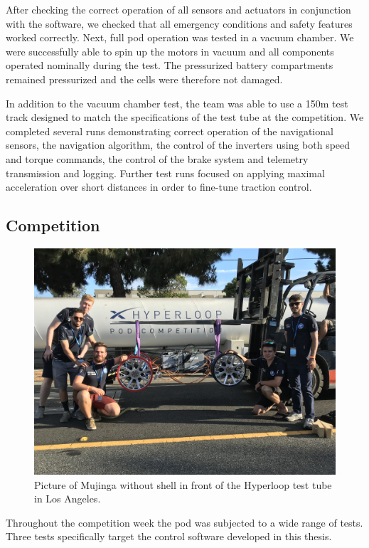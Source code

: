 After checking the correct operation of all sensors and actuators in conjunction with the software, we checked that all emergency conditions and safety features worked correctly. Next, full pod operation was tested in a vacuum chamber. We were successfully able to spin up the motors in vacuum and all components operated nominally during the test. The pressurized battery compartments remained pressurized and the cells were therefore not damaged.

In addition to the vacuum chamber test, the team was able to use a 150m test track designed to match the specifications of the test tube at the competition. We completed several runs demonstrating correct operation of the navigational sensors, the navigation algorithm, the control of the inverters using both speed and torque commands, the control of the brake system and telemetry transmission and logging. Further test runs focused on applying maximal acceleration over short distances in order to fine-tune traction control.

\subsection{Competition}

\begin{figure}[H]
  \centering \includegraphics[width=1.0\textwidth]{./figures/mujinga_competition}
  \caption{Picture of Mujinga without shell in front of the Hyperloop test tube in Los Angeles.}
\end{figure}

Throughout the competition week the pod was subjected to a wide range of tests. Three tests specifically target the control software developed in this thesis.

